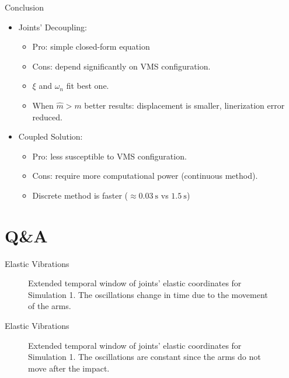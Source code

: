 \begin{frame}{Conclusion}
  \begin{itemize}
    \item Joints' Decoupling:
    \begin{itemize}
      \item Pro: simple closed-form equation
      \item Cons: depend significantly on VMS configuration.
      \item $\xi$ and $\omega_n$ fit best one.
      \item When $\hat{m}>m$ better results: displacement is smaller, linerization error reduced.
    \end{itemize}
    \item Coupled Solution:
    \begin{itemize}
      \item Pro: less susceptible to VMS configuration.
      \item Cons: require more computational power (continuous method).
      \item Discrete method is faster ($\approx \SI{0.03}{\second}$ vs $\SI{1.5}{\second}$)
    \end{itemize}
  \end{itemize}
\end{frame}

\bibliographpage

\backmatter

\section{Q\&A}

\begin{frame}{Elastic Vibrations}
  \begin{figure}
    \centering
    \quad
    \caption{Extended temporal window of joints' elastic coordinates for Simulation 1. The oscillations change in time due to the movement of the arms.}
  \end{figure}
\end{frame}

\begin{frame}{Elastic Vibrations}
  \begin{figure}
    \centering
    \quad
    \caption{Extended temporal window of joints' elastic coordinates for Simulation 1. The oscillations are constant since the arms do not move after the impact.}
  \end{figure}
\end{frame}